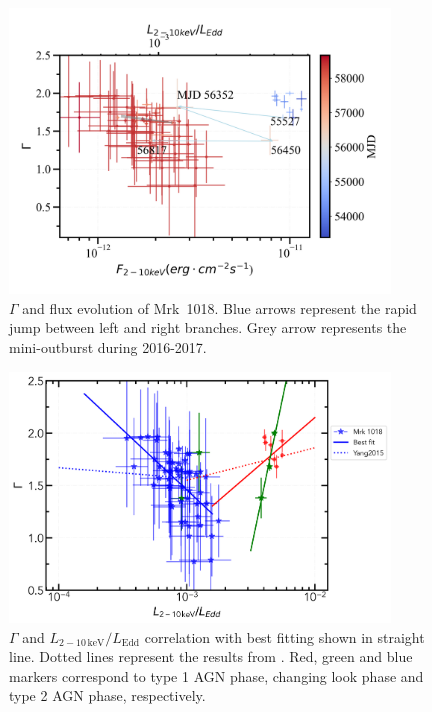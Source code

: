 \documentclass[twocolumn]{aastex63}
\begin{document}
\begin{figure}
\centering
	\includegraphics[width=0.9\textwidth]{./pic/xrayappendgood-errorbar-f-g-tmap.png}
    \caption{$\Gamma$ and flux evolution of Mrk~1018. Blue arrows represent the rapid jump between left and right branches. Grey arrow represents the mini-outburst during 2016-2017.}
    \label{fig:xrayappendgood-fandg-tmap}
\end{figure}

\begin{figure}
\centering
	\includegraphics[width=0.9\textwidth]{./pic/xrayappendgood-errorbar-Lrate-g-tmap_baseonflux.png}
    \caption{$\Gamma$ and $L_\mathrm{2-10\,keV}/L_\mathrm{Edd}$ correlation with best fitting shown in straight line. Dotted lines represent the results from \citet{2015MNRAS.447.1692Y}. Red, green and blue markers correspond to type 1 AGN phase, changing look phase and type 2 AGN phase, respectively. }
    \label{fig:xrayappendgood-Lrateandg-tmap}
\end{figure}
\end{document}
